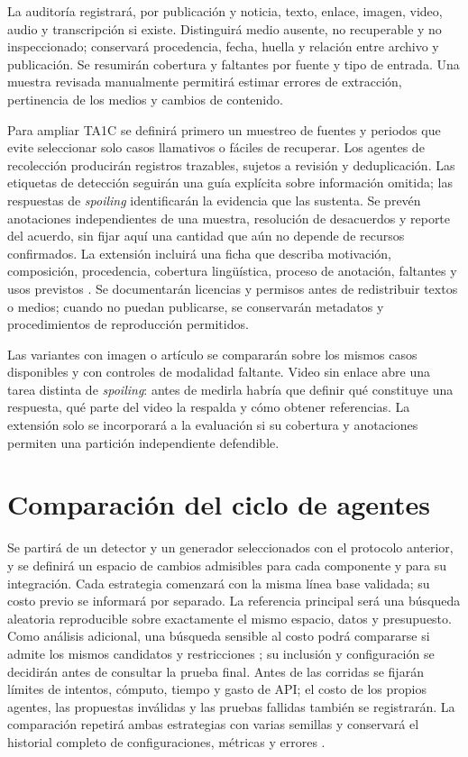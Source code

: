 La auditoría registrará, por publicación y noticia, texto, enlace, imagen, video, audio y transcripción si existe. Distinguirá medio ausente, no recuperable y no inspeccionado; conservará procedencia, fecha, huella y relación entre archivo y publicación. Se resumirán cobertura y faltantes por fuente y tipo de entrada. Una muestra revisada manualmente permitirá estimar errores de extracción, pertinencia de los medios y cambios de contenido.

Para ampliar TA1C se definirá primero un muestreo de fuentes y periodos que evite seleccionar solo casos llamativos o fáciles de recuperar. Los agentes de recolección producirán registros trazables, sujetos a revisión y deduplicación. Las etiquetas de detección seguirán una guía explícita sobre información omitida; las respuestas de \emph{spoiling} identificarán la evidencia que las sustenta. Se prevén anotaciones independientes de una muestra, resolución de desacuerdos y reporte del acuerdo, sin fijar aquí una cantidad que aún no depende de recursos confirmados. La extensión incluirá una ficha que describa motivación, composición, procedencia, cobertura lingüística, proceso de anotación, faltantes y usos previstos \citep{gebru2021datasheets,bender2018datastatements}. Se documentarán licencias y permisos antes de redistribuir textos o medios; cuando no puedan publicarse, se conservarán metadatos y procedimientos de reproducción permitidos.

Las variantes con imagen o artículo se compararán sobre los mismos casos disponibles y con controles de modalidad faltante. Video sin enlace abre una tarea distinta de \emph{spoiling}: antes de medirla habría que definir qué constituye una respuesta, qué parte del video la respalda y cómo obtener referencias. La extensión solo se incorporará a la evaluación si su cobertura y anotaciones permiten una partición independiente defendible.

\section{Comparación del ciclo de agentes}

Se partirá de un detector y un generador seleccionados con el protocolo anterior, y se definirá un espacio de cambios admisibles para cada componente y para su integración. Cada estrategia comenzará con la misma línea base validada; su costo previo se informará por separado. La referencia principal será una búsqueda aleatoria reproducible \citep{bergstra2012} sobre exactamente el mismo espacio, datos y presupuesto. Como análisis adicional, una búsqueda sensible al costo podrá compararse si admite los mismos candidatos y restricciones \citep{lee2020costawarebo}; su inclusión y configuración se decidirán antes de consultar la prueba final. Antes de las corridas se fijarán límites de intentos, cómputo, tiempo y gasto de API; el costo de los propios agentes, las propuestas inválidas y las pruebas fallidas también se registrarán. La comparación repetirá ambas estrategias con varias semillas y conservará el historial completo de configuraciones, métricas y errores \citep{huai2026agenthpobench,nathani2025mlgym,garikaparthi2026researchgym}.

